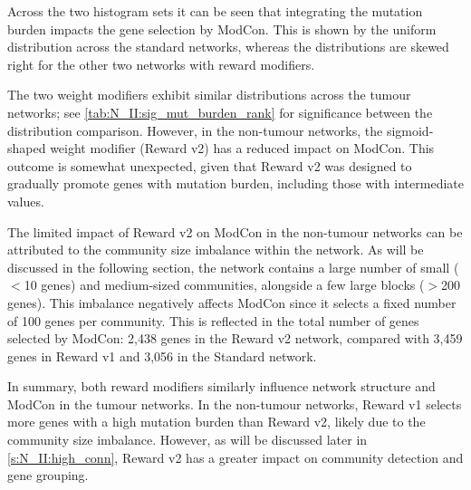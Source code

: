 Across the two histogram sets it can be seen that integrating the mutation burden impacts the gene selection by ModCon. This is shown by the uniform distribution across the standard networks, whereas the distributions are skewed right for the other two networks with reward modifiers.

The two weight modifiers exhibit similar distributions across the tumour networks; see \cref{tab:N_II:sig_mut_burden_rank} for significance between the distribution comparison. However, in the non-tumour networks, the sigmoid-shaped weight modifier (Reward v2) has a reduced impact on ModCon. This outcome is somewhat unexpected, given that Reward v2 was designed to gradually promote genes with mutation burden, including those with intermediate values.

The limited impact of Reward v2 on ModCon in the non-tumour networks can be attributed to the community size imbalance within the network. As will be discussed in the following section, the network contains a large number of small ($<$10 genes) and medium-sized communities, alongside a few large blocks ($>$200 genes). This imbalance negatively affects ModCon since it selects a fixed number of 100 genes per community. This is reflected in the total number of genes selected by ModCon: 2,438 genes in the Reward v2 network, compared with 3,459 genes in Reward v1 and 3,056 in the Standard network.

In summary, both reward modifiers similarly influence network structure and ModCon in the tumour networks. In the non-tumour networks, Reward v1 selects more genes with a high mutation burden than Reward v2, likely due to the community size imbalance. However, as will be discussed later in \cref{s:N_II:high_conn}, Reward v2 has a greater impact on community detection and gene grouping.



